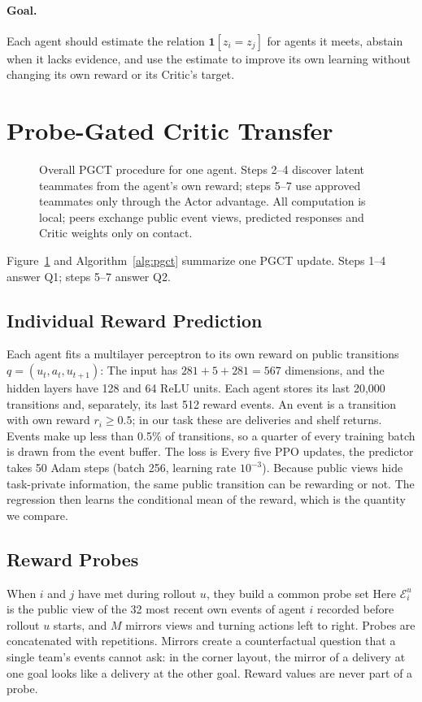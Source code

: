 \documentclass{article}
\begin{document}
\paragraph{Goal.}
Each agent should estimate the relation $\mathbf 1[z_i=z_j]$ for agents it meets, abstain when it lacks evidence, and use the estimate to improve its own learning without changing its own reward or its Critic's target.

\section{Probe-Gated Critic Transfer}
\begin{figure}[t]
\centering\resizebox{.97\textwidth}{!}{}
\caption{Overall PGCT procedure for one agent. Steps 2--4 discover latent teammates from the agent's own reward; steps 5--7 use approved teammates only through the Actor advantage. All computation is local; peers exchange public event views, predicted responses and Critic weights only on contact.}\label{fig:architecture}
\end{figure}

Figure~\ref{fig:architecture} and Algorithm~\ref{alg:pgct} summarize one PGCT update. Steps 1--4 answer Q1; steps 5--7 answer Q2.

\subsection{Individual Reward Prediction}
Each agent fits a multilayer perceptron to its own reward on public transitions $q=(u_t,a_t,u_{t+1})$:
\ModelEquation
The input has $281+5+281=567$ dimensions, and the hidden layers have 128 and 64 ReLU units. Each agent stores its last 20{,}000 transitions and, separately, its last 512 reward events. An event is a transition with own reward $r_i\ge0.5$; in our task these are deliveries and shelf returns. Events make up less than 0.5\% of transitions, so a quarter of every training batch is drawn from the event buffer. The loss is
\RewardLossEquation
Every five PPO updates, the predictor takes 50 Adam steps (batch 256, learning rate $10^{-3}$). Because public views hide task-private information, the same public transition can be rewarding or not. The regression then learns the conditional mean of the reward, which is the quantity we compare.

\subsection{Reward Probes}
When $i$ and $j$ have met during rollout $u$, they build a common probe set
\ProbeEquation
Here $\mathcal E_i^u$ is the public view of the 32 most recent own events of agent $i$ recorded before rollout $u$ starts, and $M$ mirrors views and turning actions left to right. Probes are concatenated with repetitions. Mirrors create a counterfactual question that a single team's events cannot ask: in the corner layout, the mirror of a delivery at one goal looks like a delivery at the other goal. Reward values are never part of a probe.
\end{document}
